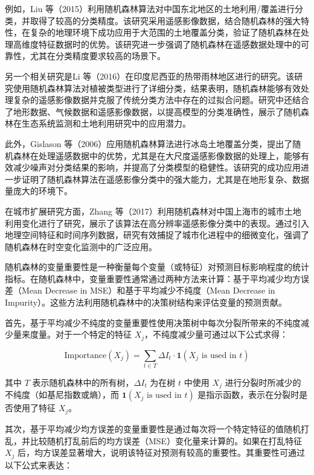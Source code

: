 \documentclass[AutoFakeBold]{LZUThesis-PgD&PhD}
\begin{document}
    例如，Liu 等（2015）利用随机森林算法对中国东北地区的土地利用/覆盖进行分类，并取得了较高的分类精度。该研究采用遥感影像数据，结合随机森林的强大特性，在复杂的地理环境下成功应用于大范围的土地覆盖分类，验证了随机森林在处理高维度特征数据时的优势\cite{liu2015}。该研究进一步强调了随机森林在遥感数据处理中的可靠性，尤其在分类精度要求较高的场景下。

    另一个相关研究是Li 等（2016）在印度尼西亚的热带雨林地区进行的研究。该研究使用随机森林算法对植被类型进行了详细分类，结果表明，随机森林能够有效处理复杂的遥感影像数据并克服了传统分类方法中存在的过拟合问题\cite{li2016}。研究中还结合了地形数据、气候数据和遥感影像数据，以提高模型的分类准确性，展示了随机森林在生态系统监测和土地利用研究中的应用潜力。

    此外，Gislason 等（2006）应用随机森林算法进行冰岛土地覆盖分类，提出了随机森林在处理遥感数据中的优势，尤其是在大尺度遥感影像数据的处理上，能够有效减少噪声对分类结果的影响，并提高了分类模型的稳健性\cite{gislason2006}。该研究的成功应用进一步证明了随机森林算法在遥感影像分类中的强大能力，尤其是在地形复杂、数据量庞大的环境下。

    在城市扩展研究方面，Zhang 等（2017）利用随机森林对中国上海市的城市土地利用变化进行了研究，展示了该算法在高分辨率遥感影像分类中的表现\cite{zhang2017}。通过引入地理空间特征和时间序列数据，研究有效捕捉了城市化进程中的细微变化，强调了随机森林在时空变化监测中的广泛应用。
    
    随机森林的变量重要性是一种衡量每个变量（或特征）对预测目标影响程度的统计指标。在随机森林中，变量重要性通常通过两种方法来计算：基于平均减少均方误差（Mean Decrease in MSE）和基于平均减少不纯度（Mean Decrease in Impurity）。这些方法利用随机森林中的决策树结构来评估变量的预测贡献。
	
	首先，基于平均减少不纯度的变量重要性使用决策树中每次分裂所带来的不纯度减少量来度量。对于一个特定的特征 \( X_j \)，不纯度减少量可通过以下公式求得：
	
	\[
	\text{Importance}(X_j) = \sum_{t \in T} \Delta I_t \cdot \mathbf{1}(X_j \text{ is used in } t)
	\]
	
	其中 \( T \) 表示随机森林中的所有树，\( \Delta I_t \) 为在树 \( t \) 中使用 \( X_j \) 进行分裂时所减少的不纯度（如基尼指数或熵），而 \( \mathbf{1}(X_j \text{ is used in } t) \) 是指示函数，表示在分裂时是否使用了特征 \( X_j \)。
	
	其次，基于平均减少均方误差的变量重要性是通过每次将一个特定特征的值随机打乱，并比较随机打乱前后的均方误差（MSE）变化量来计算的。如果在打乱特征 \( X_j \) 后，均方误差显著增大，说明该特征对预测有较高的重要性。其重要性可通过以下公式来表达：
	
\end{document}
